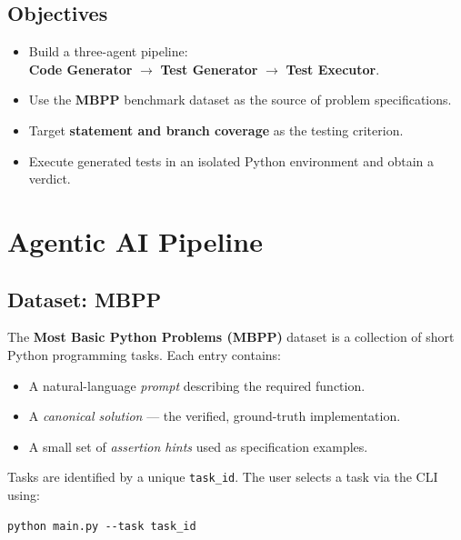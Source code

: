\documentclass[12pt, a4paper]{article}
\begin{document}
\subsection{Objectives}

\begin{itemize}[leftmargin=18pt, itemsep=2pt]
  \item Build a three-agent pipeline:\\
        \textbf{Code Generator} $\to$ \textbf{Test Generator} $\to$
        \textbf{Test Executor}.
  \item Use the \textbf{MBPP} benchmark dataset as the source of problem
        specifications.
  \item Target \textbf{statement and branch coverage} as the testing criterion.
  \item Execute generated tests in an isolated Python environment and obtain a verdict.

\end{itemize}

\section{Agentic AI Pipeline}
\label{sec:pipeline}

\subsection{Dataset: MBPP}

The \textbf{Most Basic Python Problems (MBPP)} dataset is a collection of short
Python programming tasks. Each entry contains:

\begin{itemize}[leftmargin=18pt, itemsep=2pt]
  \item A natural-language \emph{prompt} describing the required function.
  \item A \emph{canonical solution} --- the verified, ground-truth implementation.
  \item A small set of \emph{assertion hints} used as specification examples.
\end{itemize}

Tasks are identified by a unique \texttt{task\_id}. The user selects a task via
the CLI using:

\begin{codebox}
\begin{verbatim}
python main.py --task task_id
\end{verbatim}
\end{codebox}
\end{document}
